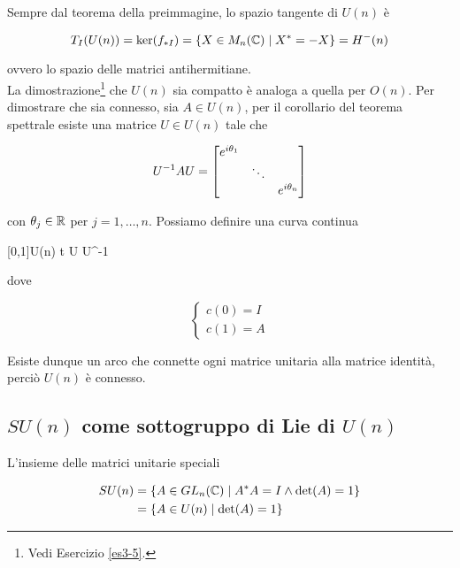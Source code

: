 Sempre dal teorema della preimmagine, lo spazio tangente di $ U(n) $ è

\begin{equation}
	T_{I}(U(n)) = \ker(f_{*I}) = \{ X \in M_{n}(\mathbb{C}) \mid X^{*} = -X \} = H^{-}(n)
\end{equation}

ovvero lo spazio delle matrici antihermitiane.\\
La dimostrazione\footnote{%
	Vedi Esercizio \ref{es3-5}.%
} che $ U(n) $ sia compatto è analoga a quella per $ O(n) $. Per dimostrare che sia connesso, sia $ A \in U(n) $, per il corollario del teorema spettrale esiste una matrice $ U \in U(n) $ tale che

\begin{equation}
	U^{-1} A U = %
	\bmqty{ %
			\dmat{ %
					e^{i \theta_{1}}, %
					\ddots, %
					e^{i \theta_{n}} %
					} %
			}
\end{equation}

con $ \theta_{j} \in \mathbb{R} $ per $ j=1,\dots,n $. Possiamo definire una curva continua

	{[0,1]}{U(n)}
	{t}{ %
			U  U^{-1} %
			}

dove

\begin{equation}
	\begin{cases}
		c(0) = I\\
		c(1) = A
	\end{cases}
\end{equation}

Esiste dunque un arco che connette ogni matrice unitaria alla matrice identità, perciò $ U(n) $ è connesso.

\subsection{$ SU(n) $ come sottogruppo di Lie di $ U(n) $}\label{ssec:su-n-lie-subg}

L'insieme delle matrici unitarie speciali

\begin{align}
	\begin{split}
		SU(n) &= \{ A \in GL_{n}(\mathbb{C}) \mid A^{*} A = I \wedge \det(A) = 1 \} \\
		&= \{ A \in U(n) \mid \det(A) = 1 \}
	\end{split}
\end{align}

